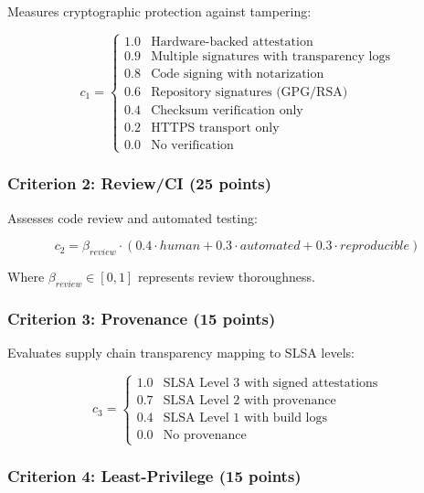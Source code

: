 \documentclass[11pt,a4paper]{article}
\begin{document}
Measures cryptographic protection against tampering:

\begin{equation}
c_1 = \begin{cases}
1.0 & \text{Hardware-backed attestation} \\
0.9 & \text{Multiple signatures with transparency logs} \\
0.8 & \text{Code signing with notarization} \\
0.6 & \text{Repository signatures (GPG/RSA)} \\
0.4 & \text{Checksum verification only} \\
0.2 & \text{HTTPS transport only} \\
0.0 & \text{No verification}
\end{cases}
\end{equation}

\subsubsection{Criterion 2: Review/CI (25 points)}

Assesses code review and automated testing:

\begin{equation}
c_2 = \beta_{review} \cdot (0.4 \cdot human + 0.3 \cdot automated + 0.3 \cdot reproducible)
\end{equation}

Where $\beta_{review} \in [0,1]$ represents review thoroughness.

\subsubsection{Criterion 3: Provenance (15 points)}

Evaluates supply chain transparency mapping to SLSA levels:

\begin{equation}
c_3 = \begin{cases}
1.0 & \text{SLSA Level 3 with signed attestations} \\
0.7 & \text{SLSA Level 2 with provenance} \\
0.4 & \text{SLSA Level 1 with build logs} \\
0.0 & \text{No provenance}
\end{cases}
\end{equation}

\subsubsection{Criterion 4: Least-Privilege (15 points)}
\end{document}
